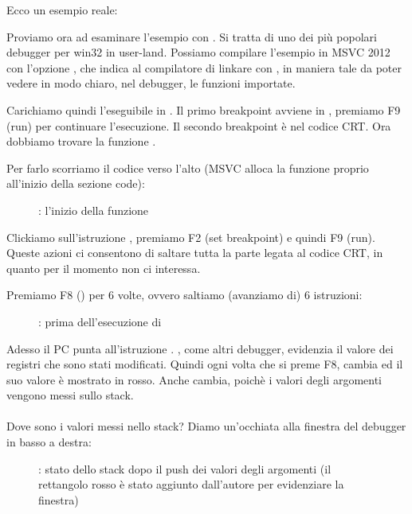 Ecco un esempio reale:



\clearpage
{}
\myindex{\olly}

Proviamo ora ad esaminare l'esempio con \olly.
Si tratta di uno dei più popolari debugger per win32 in user-land.
Possiamo compilare l'esempio in MSVC 2012 con l'opzione , che indica al compilatore di linkare con ,
in maniera tale da poter vedere in modo chiaro, nel debugger, le funzioni importate.

Carichiamo quindi l'eseguibile in \olly.
Il primo breakpoint avviene in ,
premiamo F9 (run) per continuare l'esecuzione.
Il secondo breakpoint è nel codice \ac{CRT}.
Ora dobbiamo trovare la funzione \main.

Per farlo scorriamo il codice verso l'alto (MSVC alloca la funzione \main proprio all'inizio della sezione code):
\begin{figure}[H]
\centering
{}
\caption{\olly: l'inizio della funzione \main}
\label{fig:printf3_olly_1}
\end{figure}

Clickiamo sull'istruzione , premiamo F2 (set breakpoint) e quindi F9 (run).
Queste azioni ci consentono di saltare tutta la parte legata al codice \ac{CRT}, in quanto per il momento non ci interessa.

\clearpage
Premiamo F8 (\stepover) per 6 volte, ovvero saltiamo (avanziamo di) 6 istruzioni:

\begin{figure}[H]
\centering
{}
\caption{\olly: prima dell'esecuzione di \printf}
\label{fig:printf3_olly_2}
\end{figure}

Adesso il \ac{PC} punta all'istruzione .
\olly, come altri debugger, evidenzia il valore dei registri che sono stati modificati.
Quindi ogni volta che si preme F8, \EIP cambia ed il suo valore è mostrato in rosso.
Anche \ESP cambia, poichè i valori degli argomenti vengono messi sullo stack.\\
\\
Dove sono i valori messi nello stack?
Diamo un'occhiata alla finestra del debugger in basso a destra:

\begin{figure}[H]
\centering

\caption{\olly: stato dello stack dopo il push dei valori degli argomenti (il rettangolo rosso è stato aggiunto dall'autore per evidenziare la finestra)}
\end{figure}

